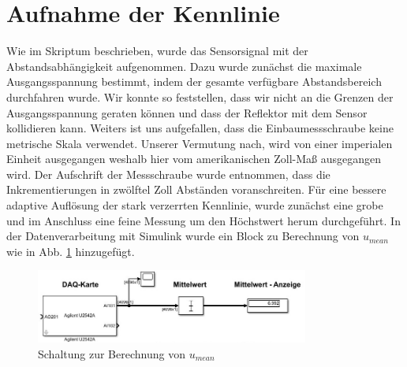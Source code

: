 \documentclass[a4paper]{article}
\begin{document}
\section{Aufnahme der Kennlinie}
Wie im Skriptum beschrieben, wurde das Sensorsignal mit der Abstandsabhängigkeit
aufgenommen. Dazu wurde zunächst die maximale Ausgangsspannung bestimmt, indem
der gesamte verfügbare Abstandsbereich durchfahren wurde. Wir konnte so feststellen,
dass wir nicht an die Grenzen der Ausgangsspannung geraten können und dass der
Reflektor mit dem Sensor kollidieren kann.\newline
Weiters ist uns aufgefallen, dass die Einbaumessschraube keine metrische Skala
verwendet. Unserer Vermutung nach, wird von einer imperialen Einheit ausgegangen
weshalb hier vom amerikanischen Zoll-Maß ausgegangen wird. Der Aufschrift 
der Messschraube wurde entnommen, dass die Inkrementierungen in zwölftel Zoll
Abständen voranschreiten.\newline
Für eine bessere adaptive Auflösung der stark verzerrten Kennlinie, wurde
zunächst eine grobe und im Anschluss eine feine Messung um den Höchstwert herum
durchgeführt. \newline
In der Datenverarbeitung mit Simulink wurde ein Block zu Berechnung von $u_{mean}$
wie in Abb. \ref{fig:umean} hinzugefügt.
\begin{figure}[h]
    \centering
    \includegraphics[width=0.8\textwidth]{schematics/schaltung_nur_mean.jpg}
    \caption{Schaltung zur Berechnung von $u_{mean}$}
    \label{fig:umean}
\end{figure}
\end{document}
